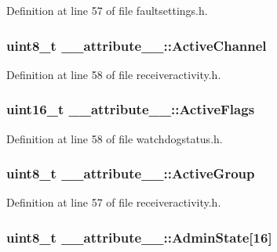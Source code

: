 \-Definition at line 57 of file faultsettings.\-h.

\hypertarget{struct____attribute_____ab99b2b1de4c16481f8ae458093df886c}{
\subsubsection[{\-Active\-Channel}]{\setlength{\rightskip}{0pt plus 5cm}uint8\-\_\-t {\bf \-\_\-\-\_\-attribute\-\_\-\-\_\-\-::\-Active\-Channel}}}\label{struct____attribute_____ab99b2b1de4c16481f8ae458093df886c}


\-Definition at line 58 of file receiveractivity.\-h.

\hypertarget{struct____attribute_____a93c0cac2ad73bb855a03ca53609e51e1}{
\subsubsection[{\-Active\-Flags}]{\setlength{\rightskip}{0pt plus 5cm}uint16\-\_\-t {\bf \-\_\-\-\_\-attribute\-\_\-\-\_\-\-::\-Active\-Flags}}}\label{struct____attribute_____a93c0cac2ad73bb855a03ca53609e51e1}


\-Definition at line 58 of file watchdogstatus.\-h.

\hypertarget{struct____attribute_____a4efe2c7e3e1bbbdc16ddf39eb9deeb89}{
\subsubsection[{\-Active\-Group}]{\setlength{\rightskip}{0pt plus 5cm}uint8\-\_\-t {\bf \-\_\-\-\_\-attribute\-\_\-\-\_\-\-::\-Active\-Group}}}\label{struct____attribute_____a4efe2c7e3e1bbbdc16ddf39eb9deeb89}


\-Definition at line 57 of file receiveractivity.\-h.

\hypertarget{struct____attribute_____a5dd83cc2f9900c44dba1336b9d4f63a6}{
\subsubsection[{\-Admin\-State}]{\setlength{\rightskip}{0pt plus 5cm}uint8\-\_\-t {\bf \-\_\-\-\_\-attribute\-\_\-\-\_\-\-::\-Admin\-State}\mbox{[}16\mbox{]}}}\label{struct____attribute_____a5dd83cc2f9900c44dba1336b9d4f63a6}


